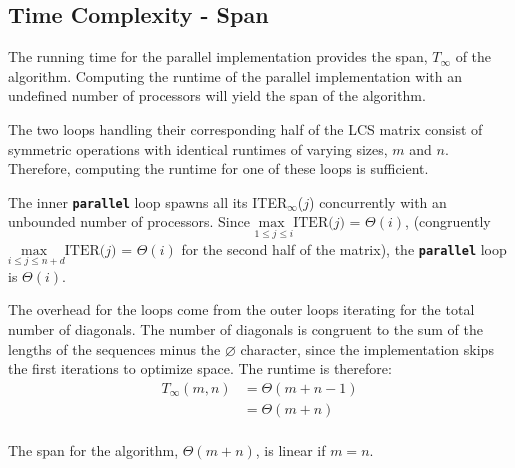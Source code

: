 \documentclass[usletter, 11pt]{extarticle}
\begin{document}
        \subsection{Time Complexity - Span} The running time for the parallel
        implementation provides the span, $T_{\infty}$ of the algorithm.
        Computing the runtime of the parallel implementation with an undefined
        number of processors will yield the span of the algorithm.

        The two loops handling their corresponding half of the LCS matrix
        consist of symmetric operations with identical runtimes of varying
        sizes, $m$ and $n$. Therefore, computing the runtime for one of these
        loops is sufficient.

        The inner \texttt{\textbf{parallel}} loop spawns all
        its ITER$_\infty$($j$) concurrently with an unbounded number of
        processors. Since $\underset{1 \le j \le i}{\text{max
        }}\text{ITER($j$)}$ = $\Theta(i)$, (congruently $\underset{i \le j \le
        n+d}{\text{max }}\text{ITER($j$)}$ = $\Theta(i)$ for the second
        half of the matrix), the \texttt{\textbf{parallel}} loop is
        $\Theta(i)$. \cite{Huang1989}

        The overhead for the loops come from the outer loops iterating for the
        total number of diagonals. The number of diagonals is congruent to the
        sum of the lengths of the sequences minus the $\varnothing$ character,
        since the implementation skips the first iterations to optimize space.
        The runtime is therefore:
        \begin{equation*}
            \begin{split}
                T_\infty(m, n) & = \Theta(m+n-1) \\
                & = \Theta(m+n) \\
            \end{split}
        \end{equation*}

        The span for the algorithm, $\Theta(m+n)$, is linear if $m = n$.
\end{document}
